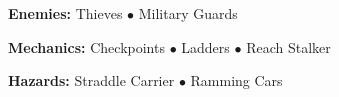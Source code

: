 \documentclass[12pt]{article}
\begin{document}
\begin{multicols}{2}
\begin{addmargin}[5mm]{0em}
\end{addmargin}
\begin{addmargin}[5mm]{0em}
\textbf{Enemies:} Thieves $\bullet$ Military Guards
\end{addmargin}
\begin{addmargin}[5mm]{0em}
\textbf{Mechanics:} Checkpoints $\bullet$ Ladders $\bullet$ Reach Stalker%
\end{addmargin}
\begin{addmargin}[5mm]{0em}
\textbf{Hazards:} Straddle Carrier $\bullet$ Ramming Cars
\end{addmargin}
\end{multicols}
\newpage
\end{document}

